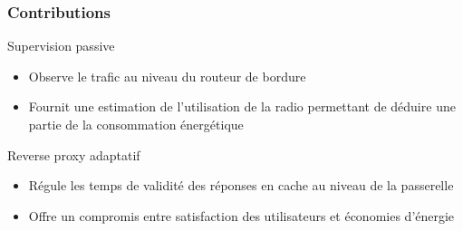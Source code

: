 \begin{frame}\frametitle{Contributions}

  \begin{alertblock}{Supervision passive}
    \begin{itemize}
      \item Observe le trafic au niveau du routeur de bordure
      \item Fournit une estimation de l'utilisation de la radio permettant de déduire une partie de la consommation énergétique
    \end{itemize}
  \end{alertblock}

  \begin{alertblock}{Reverse proxy adaptatif}
    \begin{itemize}
      \item Régule les temps de validité des réponses en cache au niveau de la passerelle
      \item Offre un compromis entre satisfaction des utilisateurs et économies d'énergie
    \end{itemize}
  \end{alertblock}


\end{frame}
